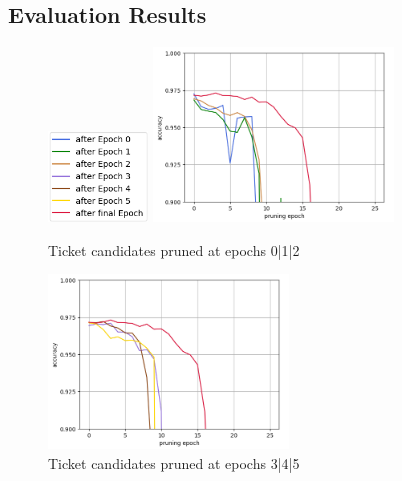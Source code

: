 \subsection*{Evaluation Results}
\begin{figure}
	\begin{minipage}{\textwidth}
		\centering
		\includegraphics[width=100px]{gfx/7-Evaluation/LTH_5_legend.png}
	\end{minipage}
	\begin{minipage}{0.5\textwidth}
		\centering
		\includegraphics[height=175px]{gfx/Experiments/EarlyTicket-MNIST-FCN/012.png}
		\caption*{Ticket candidates pruned at epochs 0|1|2}
		\label{?}
	\end{minipage}\hfill
	\begin{minipage}{0.5\textwidth}
		\centering
		\includegraphics[height=175px]{gfx/Experiments/EarlyTicket-MNIST-FCN/345.png}
		\caption*{Ticket candidates pruned at epochs 3|4|5}
		\label{?}
	\end{minipage}
\end{figure}
